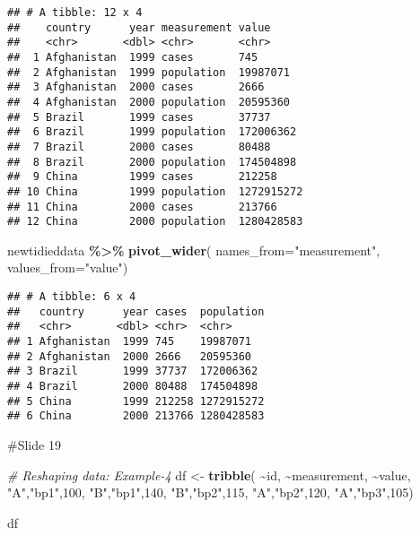 \documentclass[
]{article}
\newenvironment{Shaded}{\begin{snugshade}}{\end{snugshade}}
\newcommand{\AttributeTok}[1]{\textcolor[rgb]{0.13,0.29,0.53}{#1}}
\newcommand{\CommentTok}[1]{\textcolor[rgb]{0.56,0.35,0.01}{\textit{#1}}}
\newcommand{\DecValTok}[1]{\textcolor[rgb]{0.00,0.00,0.81}{#1}}
\newcommand{\FunctionTok}[1]{\textcolor[rgb]{0.13,0.29,0.53}{\textbf{#1}}}
\newcommand{\NormalTok}[1]{#1}
\newcommand{\OtherTok}[1]{\textcolor[rgb]{0.56,0.35,0.01}{#1}}
\newcommand{\SpecialCharTok}[1]{\textcolor[rgb]{0.81,0.36,0.00}{\textbf{#1}}}
\newcommand{\StringTok}[1]{\textcolor[rgb]{0.31,0.60,0.02}{#1}}
\begin{document}
\begin{verbatim}
## # A tibble: 12 x 4
##    country      year measurement value     
##    <chr>       <dbl> <chr>       <chr>     
##  1 Afghanistan  1999 cases       745       
##  2 Afghanistan  1999 population  19987071  
##  3 Afghanistan  2000 cases       2666      
##  4 Afghanistan  2000 population  20595360  
##  5 Brazil       1999 cases       37737     
##  6 Brazil       1999 population  172006362 
##  7 Brazil       2000 cases       80488     
##  8 Brazil       2000 population  174504898 
##  9 China        1999 cases       212258    
## 10 China        1999 population  1272915272
## 11 China        2000 cases       213766    
## 12 China        2000 population  1280428583
\end{verbatim}

\begin{Shaded}
\begin{Highlighting}[]
\NormalTok{newtidieddata }\SpecialCharTok{\%\textgreater{}\%}
  \FunctionTok{pivot\_wider}\NormalTok{(}
    \AttributeTok{names\_from=}\StringTok{"measurement"}\NormalTok{,}
    \AttributeTok{values\_from=}\StringTok{"value"}\NormalTok{)}
\end{Highlighting}
\end{Shaded}

\begin{verbatim}
## # A tibble: 6 x 4
##   country      year cases  population
##   <chr>       <dbl> <chr>  <chr>     
## 1 Afghanistan  1999 745    19987071  
## 2 Afghanistan  2000 2666   20595360  
## 3 Brazil       1999 37737  172006362 
## 4 Brazil       2000 80488  174504898 
## 5 China        1999 212258 1272915272
## 6 China        2000 213766 1280428583
\end{verbatim}

\#Slide 19

\begin{Shaded}
\begin{Highlighting}[]
\CommentTok{\# Reshaping data: Example{-}4}
\NormalTok{df }\OtherTok{\textless{}{-}} \FunctionTok{tribble}\NormalTok{(}
  \SpecialCharTok{\textasciitilde{}}\NormalTok{id, }\SpecialCharTok{\textasciitilde{}}\NormalTok{measurement, }\SpecialCharTok{\textasciitilde{}}\NormalTok{value,}
  \StringTok{"A"}\NormalTok{,}\StringTok{"bp1"}\NormalTok{,}\DecValTok{100}\NormalTok{,}
  \StringTok{"B"}\NormalTok{,}\StringTok{"bp1"}\NormalTok{,}\DecValTok{140}\NormalTok{,}
  \StringTok{"B"}\NormalTok{,}\StringTok{"bp2"}\NormalTok{,}\DecValTok{115}\NormalTok{,}
  \StringTok{"A"}\NormalTok{,}\StringTok{"bp2"}\NormalTok{,}\DecValTok{120}\NormalTok{,}
  \StringTok{"A"}\NormalTok{,}\StringTok{"bp3"}\NormalTok{,}\DecValTok{105}\NormalTok{)}

\NormalTok{df}
\end{Highlighting}
\end{Shaded}
\end{document}
